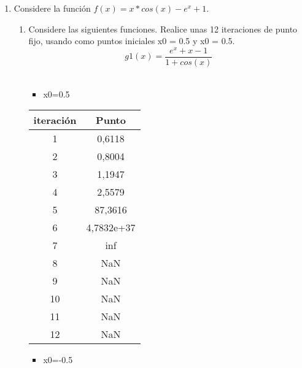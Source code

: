 \documentclass{udparticle}
\begin{document}
\begin{enumerate}
\item Considere la función \(f(x) = x*cos(x)-e^x+ 1\). %
\begin{enumerate}
    
\vspace{0.9cm}
\item Considere las siguientes funciones. Realice unas 12 iteraciones de punto fijo, usando como puntos iniciales x0 = 0.5 y x0 = 0.5.\\ 


\begin{equation}
 g1(x) = \frac{e^x+x-1}
{1 + cos(x)}
\end{equation}
\\
\begin{itemize}
\item x0=0.5
\end{itemize}


\begin{table}[H]
    \centering
        \begin{tabular} { |c|c|}
        
        \hline
        iteración  &  Punto\\
        \hline
        1 &  0,6118        \\
         \hline
        2 &  0,8004        \\
         \hline
        3 &  1,1947        \\
         \hline
        4 &  2,5579        \\
         \hline
        5 &  87,3616        \\
         \hline
        6 & 4,7832e+37        \\
         \hline
        7 & inf           \\
         \hline
        8 &  NaN        \\
         \hline
        9 &  NaN        \\
         \hline
        10 &  NaN        \\
         \hline
        11 &  NaN        \\
         \hline
        12 &  NaN        \\
        
        
        \end{tabular}
    \end{table}
 
 \begin{itemize}
\item x0=-0.5
\end{itemize}
\begin{table}[H]
    \centering
        \begin{tabular} { |c|c|}
        

\end{tabular}
\end{table}
\end{enumerate}
\end{enumerate}
\end{document}
